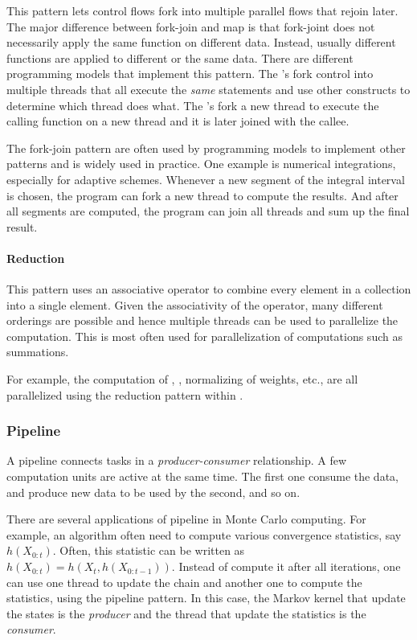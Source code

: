 This pattern lets control flows fork into multiple parallel flows that rejoin
later. The major difference between fork-join and map is that fork-joint does
not necessarily apply the same function on different data. Instead, usually
different functions are applied to different or the same data. There are
different programming models that implement this pattern.  The \openmp's
 fork control into multiple threads that all
execute the \emph{same} statements and use other constructs to determine which
thread does what. The \cilk's  fork a new thread to execute
the calling function on a new thread and it is later joined with the callee.

The fork-join pattern are often used by programming models to implement other
patterns and is widely used in practice. One example is numerical
integrations, especially for adaptive schemes. Whenever a new segment of the
integral interval is chosen, the program can fork a new thread to compute the
results. And after all segments are computed, the program can join all threads
and sum up the final result.

\paragraph{Reduction}

This pattern uses an associative operator to combine every element in a
collection into a single element. Given the associativity of the operator,
many different orderings are possible and hence multiple threads can be used
to parallelize the computation. This is most often used for parallelization of
computations such as summations.

For example, the computation of \ess, \cess, normalizing of weights, etc., are
all parallelized using the reduction pattern within \vsmc.

\subsubsection{Pipeline}
\label{ssub:Pipeline}

A pipeline connects tasks in a \emph{producer-consumer} relationship. A few
computation units are active at the same time. The first one consume the data,
and produce new data to be used by the second, and so on.

There are several applications of pipeline in Monte Carlo computing. For
example, an \mcmc algorithm often need to compute various convergence
statistics, say $h(X_{0:t})$. Often, this statistic can be written as
$h(X_{0:t}) = h(X_t, h(X_{0:{t-1}}))$. Instead of compute it after all
iterations, one can use one thread to update the \mcmc chain and another one
to compute the statistics, using the pipeline pattern. In this case, the
Markov kernel that update the states is the \emph{producer} and the thread
that update the statistics is the \emph{consumer}.

